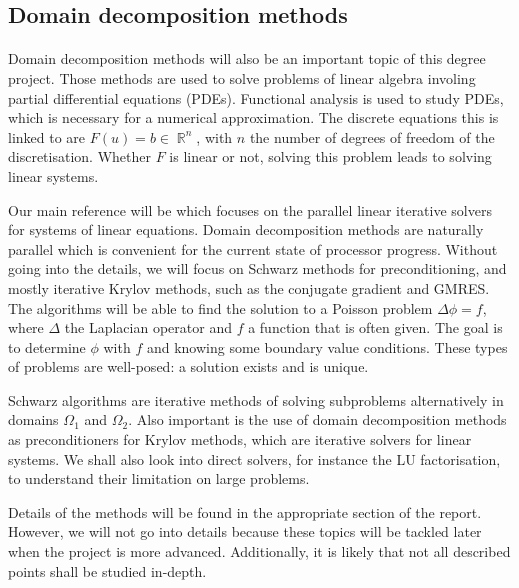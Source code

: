 \documentclass[]{article}
\DeclareMathOperator{\Real}{\mathbb{R}}
\begin{document}
\subsection{Domain decomposition methods}

\paragraph{}
Domain decomposition methods will also be an important topic of this degree project.
Those methods are used to solve problems of linear algebra involing partial differential equations (PDEs).
Functional analysis is used to study PDEs, which is necessary for a numerical approximation.
The discrete equations this is linked to are \(F(u) = b \in \Real^n\), with \(n\) the number of degrees of freedom of the discretisation.
Whether \(F\) is linear or not, solving this problem leads to solving linear systems.

Our main reference will be \cite{dolean_domain_2015} which focuses on the parallel linear iterative solvers for systems of linear equations.
Domain decomposition methods are naturally parallel which is convenient for the current state of processor progress.
Without going into the details, we will focus on Schwarz methods for preconditioning, and mostly iterative Krylov methods, such as the conjugate gradient and GMRES.
The algorithms will be able to find the solution to a Poisson problem \(\Delta \phi = f\), where \(\Delta\) the Laplacian operator and \(f\) a function that is often given.
The goal is to determine \(\phi\) with \(f\) and knowing some boundary value conditions.
These types of problems are well-posed: a solution exists and is unique.

Schwarz algorithms are iterative methods of solving subproblems alternatively in domains \(\Omega_1\) and \(\Omega_2\).
Also important is the use of domain decomposition methods as preconditioners for Krylov methods, which are iterative solvers for linear systems.
We shall also look into direct solvers, for instance the LU factorisation, to understand their limitation on large problems.

Details of the methods will be found in the appropriate section of the report.
However, we will not go into details because these topics will be tackled later when the project is more advanced.
Additionally, it is likely that not all described points shall be studied in-depth.

\clearpage
\printbibliography
\end{document}

